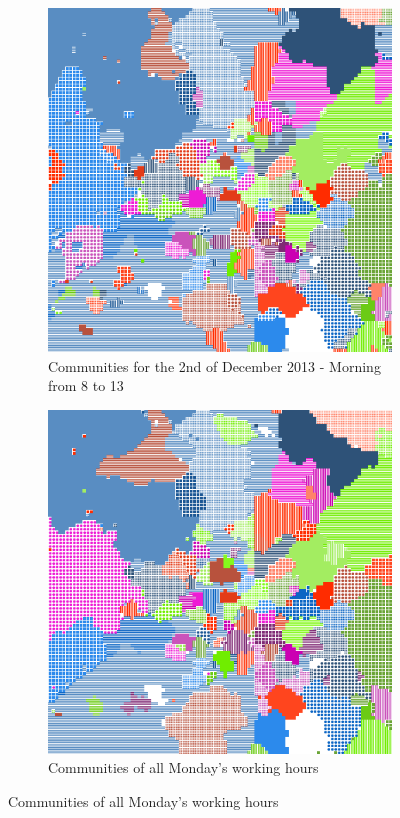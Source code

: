 \documentclass[12pt,a4paper]{article}
\begin{document}
\begin{figure}[H]
\begin{subfigure}[b]{0.48\textwidth}
\includegraphics[width=\textwidth]{monDet/2MonM.png}
\caption{Communities for the 2nd of December 2013 - Morning from 8 to 13}
\end{subfigure}
\begin{subfigure}[b]{0.48\textwidth}
\includegraphics[width=\textwidth]{monDet/1Mon.png}
\caption{Communities of all Monday's working hours}
\end{subfigure}
\end{figure}
\end{document}
